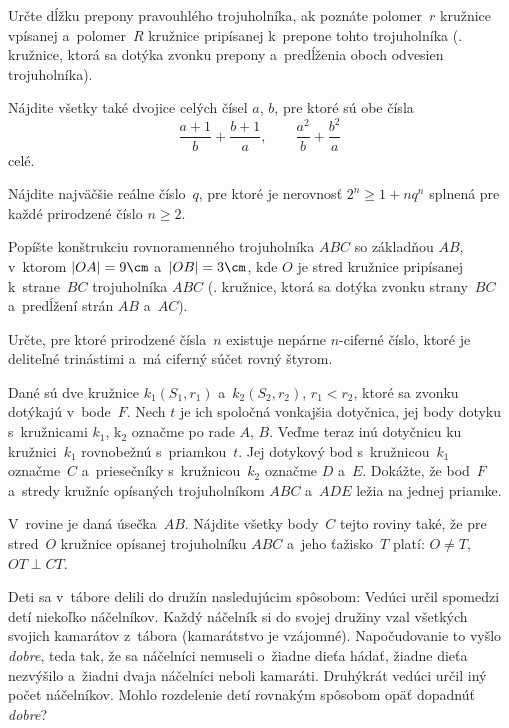 {%
Určte dĺžku prepony pravouhlého trojuholníka, ak poznáte
polomer~$r$ kružnice vpísanej a~polomer~$R$ kružnice pripísanej
k~prepone tohto trojuholníka (\tj. kružnice, ktorá sa dotýka
zvonku prepony a~predĺženia oboch odvesien
trojuholníka).}

{%
Nájdite všetky také dvojice celých čísel $a$, $b$, pre ktoré sú obe
čísla
$$
\frac {a+1}b + \frac {b+1}a  ,\qquad
\frac {a^2}b + \frac {b^2}a
$$
celé.}

{%
Nájdite najväčšie reálne číslo~$q$, pre ktoré je nerovnosť
$2^n\ge 1+nq^n$ splnená pre každé prirodzené číslo $n\ge 2$.}

{%
Popíšte konštrukciu rovnoramenného trojuholníka $ABC$ so základňou
$AB$, v~ktorom $|OA| = 9\cm$ a~$|OB| = 3\cm$, kde $O$ je stred
kružnice pripísanej k~strane~$BC$ trojuholníka $ABC$ (\tj. kružnice,
ktorá sa dotýka zvonku strany~$BC$ a~predĺžení strán $AB$ a~$AC$).}

{%
Určte, pre ktoré prirodzené čísla~$n$ existuje
nepárne $n$-ciferné číslo, ktoré je deliteľné trinástimi a~má
ciferný súčet rovný štyrom.}

{%
Dané sú dve kružnice $k_1(S_1,r_1)$ a~$k_2(S_2,r_2)$, $r_1<r_2$,
ktoré sa zvonku dotýkajú v~bode~$F$.
Nech $t$ je ich spoločná vonkajšia dotyčnica,
jej body dotyku s~kružnicami $k_1$, k$_2$ označme po rade $A$, $B$.
Veďme teraz inú dotyčnicu ku kružnici~$k_1$ rovnobežnú s~priamkou~$t$.
Jej dotykový bod s~kružnicou~$k_1$ označme~$C$ a~priesečníky s~kružnicou~$k_2$ označme
$D$ a~$E$.
Dokážte, že bod~$F$ a~stredy kružníc opísaných trojuholníkom
$ABC$ a~$ADE$ ležia na jednej priamke.}

{%
V~rovine je daná úsečka~$AB$. Nájdite všetky body~$C$ tejto roviny
také, že pre stred~$O$ kružnice opísanej trojuholníku $ABC$ a~jeho
ťažisko~$T$ platí:
$O\neq T$, $OT \perp CT$.}

{%
Deti sa v~tábore delili do družín
nasledujúcim spôsobom:
Vedúci určil spomedzi detí niekoľko náčelníkov.
Každý náčelník si do svojej družiny
vzal všetkých svojich kamarátov z~tábora (kamarátstvo je vzájomné).
Napočudovanie to vyšlo {\it dobre}, teda tak, že sa náčelníci
nemuseli o~žiadne dieťa hádať, žiadne dieťa nezvýšilo a~žiadni dvaja
náčelníci neboli kamaráti.
Druhýkrát vedúci určil iný počet náčelníkov.
Mohlo rozdelenie detí rovnakým spôsobom opäť dopadnúť {\it dobre}?}

